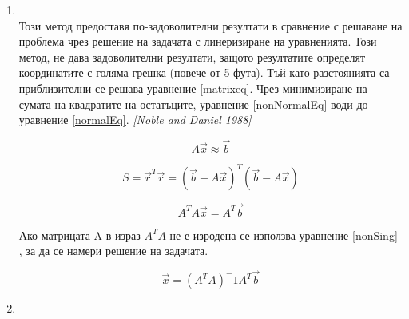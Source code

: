 \begin{enumerate}
    \item {} \\ Този метод предоставя по-задоволителни резултати в сравнение с решаване на проблема чрез решение на задачата с линеризиране на уравненията.  Този метод, не дава задоволителни резултати, защото резултатите определят координатите с голяма грешка (повече от 5 фута). Тъй като разстоянията са приблизителни се решава уравнение \ref{matrixeq}. Чрез минимизиране на сумата на квадратите на остатъците, уравнение \ref{nonNormalEq} води до уравнение \ref{normalEq}. \textit{[Noble and Daniel 1988]}
    
    \begin{equation} \label{matrixeq}
      A \vec{x} \approx \vec{b} 
    \end{equation}
    
    \begin{equation} \label{nonNormalEq}
        S = \vec{r}^T \vec{r} = (\vec{b} - A \vec{x})^T ( \vec{b} - A \vec{x})
    \end{equation}
    
    \begin{equation} \label{normalEq}
        A^T A \vec{x} = A^T \vec{b}
    \end{equation}
    
        
    Ако матрицата A в израз $A^T A$ не е изродена се използва уравнение \ref{nonSing} , за да се намери решение на задачата.

    \begin{equation} \label{nonSing}
        \vec{x} = (A^T A)^-1 A^T \vec{b}
    \end{equation}
    
    \item
    
\end{enumerate}

